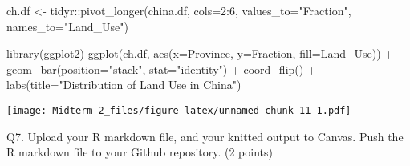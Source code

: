 \documentclass[
]{article}
\newenvironment{Shaded}{\begin{snugshade}}{\end{snugshade}}
\newcommand{\AttributeTok}[1]{\textcolor[rgb]{0.77,0.63,0.00}{#1}}
\newcommand{\DecValTok}[1]{\textcolor[rgb]{0.00,0.00,0.81}{#1}}
\newcommand{\FunctionTok}[1]{\textcolor[rgb]{0.00,0.00,0.00}{#1}}
\newcommand{\NormalTok}[1]{#1}
\newcommand{\OtherTok}[1]{\textcolor[rgb]{0.56,0.35,0.01}{#1}}
\newcommand{\SpecialCharTok}[1]{\textcolor[rgb]{0.00,0.00,0.00}{#1}}
\newcommand{\StringTok}[1]{\textcolor[rgb]{0.31,0.60,0.02}{#1}}
\begin{document}
\begin{Shaded}
\begin{Highlighting}[]
\NormalTok{ch.df }\OtherTok{\textless{}{-}}\NormalTok{ tidyr}\SpecialCharTok{::}\FunctionTok{pivot\_longer}\NormalTok{(china.df, }\AttributeTok{cols=}\DecValTok{2}\SpecialCharTok{:}\DecValTok{6}\NormalTok{, }\AttributeTok{values\_to=}\StringTok{"Fraction"}\NormalTok{, }\AttributeTok{names\_to=}\StringTok{"Land\_Use"}\NormalTok{)}

\FunctionTok{library}\NormalTok{(ggplot2)}
\FunctionTok{ggplot}\NormalTok{(ch.df, }\FunctionTok{aes}\NormalTok{(}\AttributeTok{x=}\NormalTok{Province, }\AttributeTok{y=}\NormalTok{Fraction, }\AttributeTok{fill=}\NormalTok{Land\_Use)) }\SpecialCharTok{+}
  \FunctionTok{geom\_bar}\NormalTok{(}\AttributeTok{position=}\StringTok{"stack"}\NormalTok{, }\AttributeTok{stat=}\StringTok{"identity"}\NormalTok{)  }\SpecialCharTok{+}
  \FunctionTok{coord\_flip}\NormalTok{() }\SpecialCharTok{+}
  \FunctionTok{labs}\NormalTok{(}\AttributeTok{title=}\StringTok{"Distribution of Land Use in China"}\NormalTok{)}
\end{Highlighting}
\end{Shaded}

\texttt{[image: Midterm-2\_files/figure-latex/unnamed-chunk-11-1.pdf]}

Q7. Upload your R markdown file, and your knitted output to Canvas. Push
the R markdown file to your Github repository. (2 points)
\end{document}
